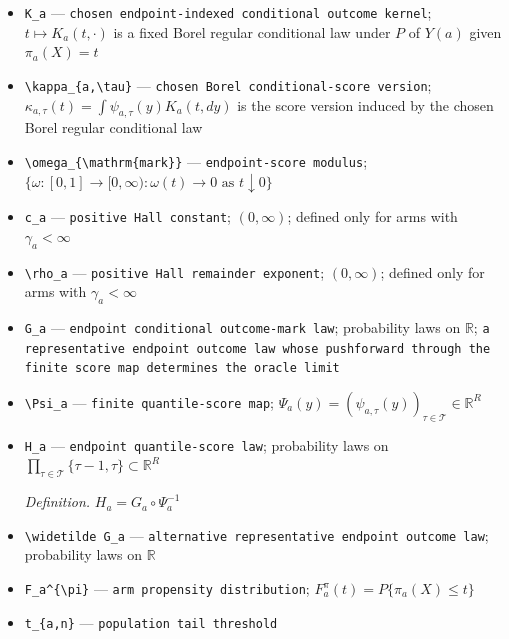 \documentclass{article}
\begin{document}
\begin{itemize}
  \item \texttt{K\_\allowbreak{}a} --- \texttt{chosen endpoint-\allowbreak{}indexed conditional outcome kernel}; \(t\mapsto K_a(t,\cdot)\) is a fixed Borel regular conditional law under \(P\) of \(Y(a)\) given \(\pi_a(X)=t\)
  \item \texttt{\textbackslash{}\allowbreak{}kappa\_\allowbreak{}\{a,\allowbreak{}\textbackslash{}\allowbreak{}tau\}\allowbreak{}} --- \texttt{chosen Borel conditional-\allowbreak{}score version}; \(\kappa_{a,\tau}(t)=\int\psi_{a,\tau}(y)K_a(t,dy)\) is the score version induced by the chosen Borel regular conditional law
  \item \texttt{\textbackslash{}\allowbreak{}omega\_\allowbreak{}\{\textbackslash{}\allowbreak{}mathrm\{mark\}\allowbreak{}\}\allowbreak{}} --- \texttt{endpoint-\allowbreak{}score modulus}; \(\{\omega:[0,1]\to[0,\infty):\omega(t)\to0\text{ as }t\downarrow0\}\)
  \item \texttt{c\_\allowbreak{}a} --- \texttt{positive Hall constant}; \((0,\infty)\); defined only for arms with \(\gamma_a<\infty\)
  \item \texttt{\textbackslash{}\allowbreak{}rho\_\allowbreak{}a} --- \texttt{positive Hall remainder exponent}; \((0,\infty)\); defined only for arms with \(\gamma_a<\infty\)
  \item \texttt{G\_\allowbreak{}a} --- \texttt{endpoint conditional outcome-\allowbreak{}mark law}; probability laws on \(\mathbb R\); \texttt{a representative endpoint outcome law whose pushforward through the finite score map determines the oracle limit}
  \item \texttt{\textbackslash{}\allowbreak{}Psi\_\allowbreak{}a} --- \texttt{finite quantile-\allowbreak{}score map}; \(\Psi_a(y)=(\psi_{a,\tau}(y))_{\tau\in\mathcal T}\in\mathbb R^R\)
  \item \texttt{H\_\allowbreak{}a} --- \texttt{endpoint quantile-\allowbreak{}score law}; probability laws on \(\prod_{\tau\in\mathcal T}\{\tau-1,\tau\}\subset\mathbb R^R\)
  \par\smallskip\noindent\emph{Definition.} \(H_a=G_a\circ\Psi_a^{-1}\)
  \item \texttt{\textbackslash{}\allowbreak{}widetilde G\_\allowbreak{}a} --- \texttt{alternative representative endpoint outcome law}; probability laws on \(\mathbb R\)
  \item \texttt{F\_\allowbreak{}a\textasciicircum{}\{\textbackslash{}\allowbreak{}pi\}\allowbreak{}} --- \texttt{arm propensity distribution}; \(F_a^{\pi}(t)=P\{\pi_a(X)\le t\}\)
  \item \texttt{t\_\allowbreak{}\{a,\allowbreak{}n\}\allowbreak{}} --- \texttt{population tail threshold}

\end{itemize}
\end{document}
